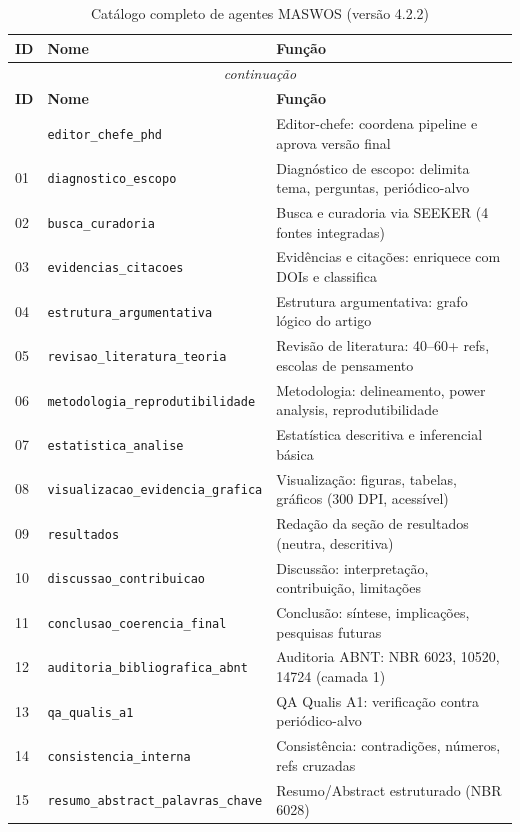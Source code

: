 \begin{longtable}{p{0.8cm} p{4.5cm} p{10cm}}
\caption{Catálogo completo de agentes MASWOS (versão 4.2.2)}
\label{tab:catalogo_completo} \\
\toprule
\textbf{ID} & \textbf{Nome} & \textbf{Função} \\
\midrule
\endfirsthead
\multicolumn{3}{c}{\textit{continuação}} \\
\toprule
\textbf{ID} & \textbf{Nome} & \textbf{Função} \\
\midrule
\endhead
\bottomrule
\endfoot
00 & \texttt{editor\_chefe\_phd} & Editor-chefe: coordena pipeline e aprova versão final \\
01 & \texttt{diagnostico\_escopo} & Diagnóstico de escopo: delimita tema, perguntas, periódico-alvo \\
02 & \texttt{busca\_curadoria} & Busca e curadoria via SEEKER (4 fontes integradas) \\
03 & \texttt{evidencias\_citacoes} & Evidências e citações: enriquece com DOIs e classifica \\
04 & \texttt{estrutura\_argumentativa} & Estrutura argumentativa: grafo lógico do artigo \\
05 & \texttt{revisao\_literatura\_teoria} & Revisão de literatura: 40--60+ refs, escolas de pensamento \\
06 & \texttt{metodologia\_reprodutibilidade} & Metodologia: delineamento, power analysis, reprodutibilidade \\
07 & \texttt{estatistica\_analise} & Estatística descritiva e inferencial básica \\
08 & \texttt{visualizacao\_evidencia\_grafica} & Visualização: figuras, tabelas, gráficos (300 DPI, acessível) \\
09 & \texttt{resultados} & Redação da seção de resultados (neutra, descritiva) \\
10 & \texttt{discussao\_contribuicao} & Discussão: interpretação, contribuição, limitações \\
11 & \texttt{conclusao\_coerencia\_final} & Conclusão: síntese, implicações, pesquisas futuras \\
12 & \texttt{auditoria\_bibliografica\_abnt} & Auditoria ABNT: NBR 6023, 10520, 14724 (camada 1) \\
13 & \texttt{qa\_qualis\_a1} & QA Qualis A1: verificação contra periódico-alvo \\
14 & \texttt{consistencia\_interna} & Consistência: contradições, números, refs cruzadas \\
15 & \texttt{resumo\_abstract\_palavras\_chave} & Resumo/Abstract estruturado (NBR 6028) \\

\end{longtable}
